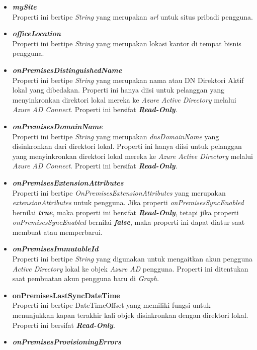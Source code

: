 \begin{itemize}
	\item \textbf{\textit{mySite}}\\
	Properti ini bertipe \textit{String} yang merupakan \textit{url} untuk situs pribadi pengguna.
	\item \textbf{\textit{officeLocation}}\\
	Properti ini bertipe \textit{String} yang merupakan lokasi kantor di tempat bisnis pengguna.
	\item \textbf{\textit{onPremisesDistinguishedName}}\\
	Properti ini bertipe \textit{String} yang merupakan nama atau DN Direktori Aktif lokal yang dibedakan. Properti ini hanya diisi untuk pelanggan yang menyinkronkan direktori lokal mereka ke \textit{Azure Active Directory} melalui \textit{Azure AD Connect}. Properti ini bersifat \textbf{\textit{Read-Only}}.
	\item \textbf{\textit{onPremisesDomainName}}\\
	Properti ini bertipe \textit{String} yang merupakan \textit{dnsDomainName} yang disinkronkan dari direktori lokal. Properti ini hanya diisi untuk pelanggan yang menyinkronkan direktori lokal mereka ke \textit{Azure Active Directory} melalui \textit{Azure AD Connect}. Properti ini bersifat \textbf{\textit{Read-Only}}.
	\item \textbf{\textit{onPremisesExtensionAttributes}}\\
	Properti ini bertipe \textit{OnPremisesExtensionAttributes} yang merupakan \textit{extensionAttributes} untuk pengguna. Jika properti \textit{onPremisesSyncEnabled} bernilai \textbf{\textit{true}}, maka properti ini bersifat \textbf{\textit{Read-Only}}, tetapi jika properti \textit{onPremisesSyncEnabled} bernilai \textbf{\textit{false}}, maka properti ini dapat diatur saat membuat atau memperbarui.
	\item \textbf{\textit{onPremisesImmutableId}}\\
	Properti ini bertipe \textit{String} yang digunakan untuk mengaitkan akun pengguna \textit{Active Directory} lokal ke objek \textit{Azure AD} pengguna. Properti ini ditentukan saat pembuatan akun pengguna baru di \textit{Graph}.
	\item \textbf{onPremisesLastSyncDateTime}\\
	Properti ini bertipe DateTimeOffset yang memiliki fungsi untuk menunjukkan kapan terakhir kali objek disinkronkan dengan direktori lokal. Properti ini bersifat \textbf{\textit{Read-Only}}. 
	\item \textbf{\textit{onPremisesProvisioningErrors}}\\

\end{itemize}
